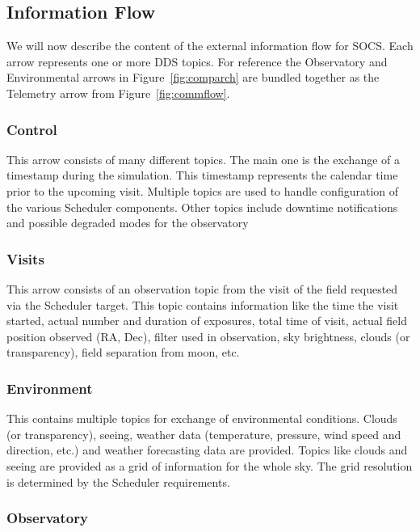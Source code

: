 \documentclass[]{spie}  %
\begin{document}
\subsection{Information Flow}

We will now describe the content of the external information flow for SOCS. Each arrow represents one or more DDS topics. For reference the Observatory and Environmental arrows in Figure~\ref{fig:comparch} are bundled together as the Telemetry arrow from Figure~\ref{fig:commflow}.

\subsubsection{Control}

This arrow consists of many different topics. The main one is the exchange of a timestamp during the simulation. This timestamp represents the calendar time prior to the upcoming visit. Multiple topics are used to handle configuration of the various Scheduler components. Other topics include downtime notifications and possible degraded modes for the observatory

\subsubsection{Visits}

This arrow consists of an observation topic from the visit of the field requested via the Scheduler target. This topic contains information like the time the visit started, actual number and duration of exposures, total time of visit, actual field position observed (RA, Dec), filter used in observation, sky brightness, clouds (or transparency), field separation from moon, etc.

\subsubsection{Environment}

This contains multiple topics for exchange of environmental conditions. Clouds (or transparency), seeing, weather data (temperature, pressure, wind speed and direction, etc.) and weather forecasting data are provided. Topics like clouds and seeing are provided as a grid of information for the whole sky. The grid resolution is determined by the Scheduler requirements.

\subsubsection{Observatory}
\end{document}
